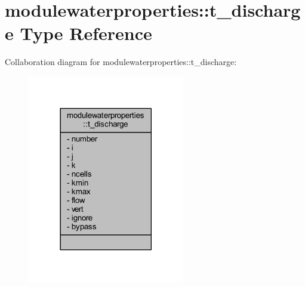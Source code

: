 \hypertarget{structmodulewaterproperties_1_1t__discharge}{}\section{modulewaterproperties\+:\+:t\+\_\+discharge Type Reference}
\label{structmodulewaterproperties_1_1t__discharge}


Collaboration diagram for modulewaterproperties\+:\+:t\+\_\+discharge\+:\nopagebreak
\begin{figure}[H]
\begin{center}
\leavevmode
\includegraphics[width=194pt]{structmodulewaterproperties_1_1t__discharge__coll__graph}
\end{center}
\end{figure}
